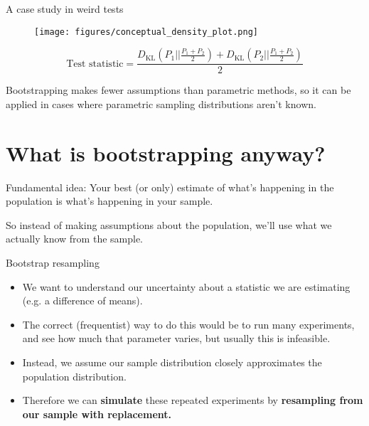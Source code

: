 \documentclass{beamer} %
\begin{document}
\begin{frame}{A case study in weird tests}
\begin{figure}
\centering
\texttt{[image: figures/conceptual\_density\_plot.png]}
\end{figure}
$$\text{Test statistic} = \frac{D_\text{KL}\left(P_1 || \frac{P_1 + P_2}{2}\right) + D_\text{KL}\left(P_2 || \frac{P_1 + P_2}{2}\right)}{2}$$
\end{frame}

\begin{frame}[standout]
Bootstrapping makes fewer assumptions than parametric methods, so it can be applied in cases where parametric sampling distributions aren't known. 
\end{frame}

\section{What is bootstrapping anyway?}

\begin{frame}[standout]
Fundamental idea: Your best (or only) estimate of what's happening in the population is what's happening in your sample. 
\end{frame}


\begin{frame}[standout]
So instead of making assumptions about the population, we'll use what we actually know from the sample.
\end{frame}

\begin{frame}{Bootstrap resampling}
\begin{itemize}[<+->] \itemsep 1em
\item We want to understand our uncertainty about a statistic we are estimating (e.g. a difference of means).
\item The correct (frequentist) way to do this would be to run many experiments, and see how much that parameter varies, but usually this is infeasible.
\item Instead, we assume our sample distribution closely approximates the population distribution.
\item Therefore we can \textbf{simulate} these repeated experiments by \textbf{resampling from our sample with replacement.}
\end{itemize}
\end{frame}
\end{document}
